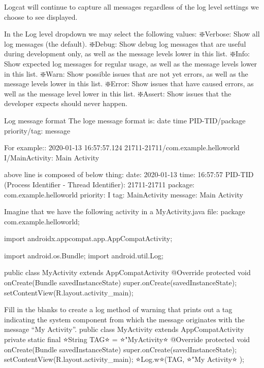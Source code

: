         Logcat will continue to capture all messages regardless of the log level settings we choose to see displayed.

        In the Log level dropdown we may select the following values:
            ❇️Verbose: Show all log messages (the default).
            ❇️Debug: Show debug log messages that are useful during development only, as well as the message levels lower in this list.
            ❇️Info: Show expected log messages for regular usage, as well as the message levels lower in this list.
            ❇️Warn: Show possible issues that are not yet errors, as well as the message levels lower in this list.
            ❇️Error: Show issues that have caused errors, as well as the message level lower in this list.
            ❇️Assert: Show issues that the developer expects should never happen.

    Log message format
        The loge message format is:
            date time PID-TID/package priority/tag: message

        For example::
            2020-01-13 16:57:57.124 21711-21711/com.example.helloworld I/MainActivity: Main Activity
        
        above line is composed of below thing:
            date: 2020-01-13
            time: 16:57:57
            PID-TID (Process Identifier - Thread Identifier): 21711-21711
            package: com.example.helloworld
            priority: I
            tag: MainActivity
            message: Main Activity


        Imagine that we have the following activity in a MyActivity.java file:
            package com.example.helloworld;
            
            import androidx.appcompat.app.AppCompatActivity;
            
            import android.os.Bundle;
            import android.util.Log;
            
            public class MyActivity extends AppCompatActivity {
                @Override
                protected void onCreate(Bundle savedInstanceState) {
                    super.onCreate(savedInstanceState);
                    setContentView(R.layout.activity_main);
                }
            }

        Fill in the blanks to create a log method of warning that prints out a tag indicating the system component from which the message originates with the message “My Activity”.
            public class MyActivity extends AppCompatActivity {
                private static final ⭐String TAG⭐ = ⭐"MyActivity⭐ 
                @Override
                protected void onCreate(Bundle savedInstanceState) {
                    super.onCreate(savedInstanceState);
                    setContentView(R.layout.activity_main);
                    ⭐Log.w⭐(TAG, ⭐"My Activity⭐ );
                }
            }

